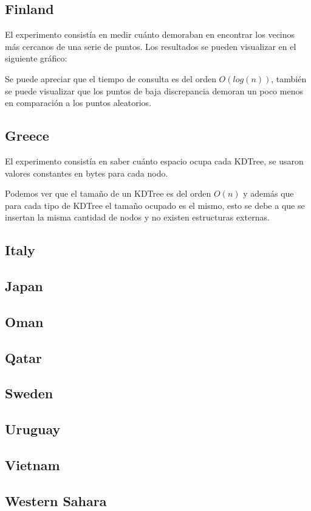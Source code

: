 \documentclass[12pt,letterpaper, margin = 3cm]{article}
\begin{document}
\subsection{Finland}
El experimento consistía en medir cuánto demoraban en encontrar los vecinos más cercanos de una serie de puntos. Los resultados se pueden visualizar en el siguiente gráfico:


Se puede apreciar que el tiempo de consulta es del orden $O(log(n))$, también se puede visualizar que los puntos de baja discrepancia demoran un poco menos en comparación a los puntos aleatorios.

\newpage
\subsection{Greece} 
El experimento consistía en saber cuánto espacio ocupa cada KDTree, se usaron valores constantes en bytes para cada nodo. 

Podemos ver que el tamaño de un KDTree es del orden $O(n)$ y además que para cada tipo de KDTree el tamaño ocupado es el mismo, esto se debe a que se insertan la misma cantidad de nodos y no existen estructuras externas.

\subsection{Italy}
\subsection{Japan}
\subsection{Oman}
\subsection{Qatar}
\subsection{Sweden}
\subsection{Uruguay}
\subsection{Vietnam}
\subsection{Western Sahara}
\end{document}
